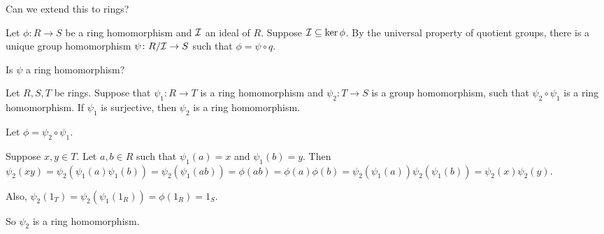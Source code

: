 \documentclass[12pt,letterpaper]{report}
\begin{document}
\begin{center}
\end{center}

Can we extend this to rings?

Let $\phi \colon R \to S$ be a ring homomorphism and $\mathcal{I}$ an ideal of $R$.
Suppose $\mathcal{I} \subseteq \ker\phi$.
By the universal property of quotient groups, there is a unique group homomorphism
$\psi \colon R/\mathcal{I} \to S$ such that $\phi = \psi \circ q$.

\begin{center}
\end{center}

Is $\psi$ a ring homomorphism?

\begin{lem}{}{}
  Let $R, S, T$ be rings.
  Suppose that $\psi_1 \colon R \to T$ is a ring homomorphism and $\psi_2 \colon T \to S$ is a
  group homomorphism, such that $\psi_2 \circ \psi_1$ is a ring homomorphism.
  If $\psi_1$ is surjective, then $\psi_2$ is a ring homomorphism.
\end{lem}

\begin{thmproof}
  Let $\phi = \psi_2 \circ \psi_1$.

  Suppose $x, y \in T$.
  Let $a, b \in R$ such that $\psi_1(a) = x$ and $\psi_1(b) = y$.
  Then $\psi_2(xy) = \psi_2(\psi_1(a)\psi_1(b)) = \psi_2(\psi_1(ab)) = \phi(ab) = \phi(a)\phi(b)
    = \psi_2(\psi_1(a))\psi_2(\psi_1(b)) = \psi_2(x)\psi_2(y)$.

  Also, $\psi_2(1_T) = \psi_2(\psi_1(1_R)) = \phi(1_R) = 1_S$.

  So $\psi_2$ is a ring homomorphism.
\end{thmproof}
\end{document}

